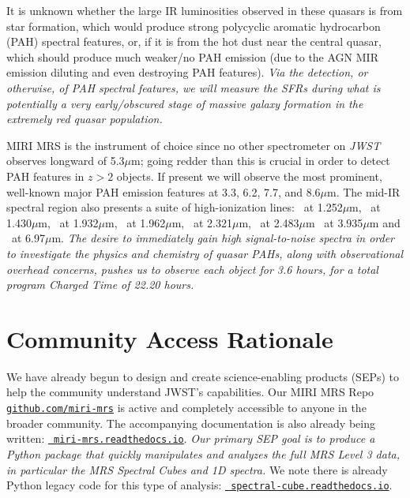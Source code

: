 \smallskip \smallskip
\noindent
It is unknown whether the large IR luminosities observed in these
quasars is from star formation, which would produce strong polycyclic
aromatic hydrocarbon (PAH) spectral features, or, if it is from the hot
dust near the central quasar, which should produce much weaker/no PAH
emission (due to the AGN MIR emission diluting and even destroying PAH
features). {\it Via the detection, or otherwise, of PAH spectral
features, we will measure the SFRs during what is potentially a very
early/obscured stage of massive galaxy formation in the extremely red
quasar population.}

\smallskip \smallskip
\noindent
MIRI MRS is the instrument of choice since no other spectrometer on
{\it JWST} observes longward of 5.3$\mu$m; going redder than this is
crucial in order to detect PAH features in $z>2$ objects.  If present
we will observe the most prominent, well-known major PAH emission
features at 3.3, 6.2, 7.7, and 8.6$\mu$m. The mid-IR spectral region
also presents a suite of high-ionization lines: \snine\ at
1.252$\mu$m, \six\ at 1.430$\mu$m, \sixi\ at 1.932$\mu$m, \sivi\ at
1.962$\mu$m, \caviii\ at 2.321$\mu$m, \sivi\ at 2.483$\mu$m \siix\ at
3.935$\mu$m and \arii\ at 6.97$\mu$m.  {\it The desire to immediately
gain high signal-to-noise spectra in order to investigate the physics
and chemistry of quasar PAHs, along with observational overhead
concerns, pushes us to observe each object for 3.6 hours, for a total
program Charged Time of 22.20 hours.}

\section*{Community Access Rationale}
\vspace{-6pt}
\noindent
We have already begun to design and create science-enabling products
(SEPs) to help the community understand JWST's capabilities.  Our MIRI
MRS Repo \href{https://github.com/miri-mrs}{{\tt github.com/miri-mrs}}
is active and completely accessible to anyone in the broader
community.  The accompanying documentation is also already being
written: \href{http://miri-mrs.readthedocs.io/}{{\tt
miri-mrs.readthedocs.io}}.  {\it Our primary SEP goal is to produce a
Python package that quickly manipulates and analyzes the full MRS
Level 3 data, in particular the MRS Spectral Cubes and 1D spectra. }
We note there is already Python legacy code for this type of analysis:
\href{https://spectral-cube.readthedocs.io/}{\tt
spectral-cube.readthedocs.io}. 

